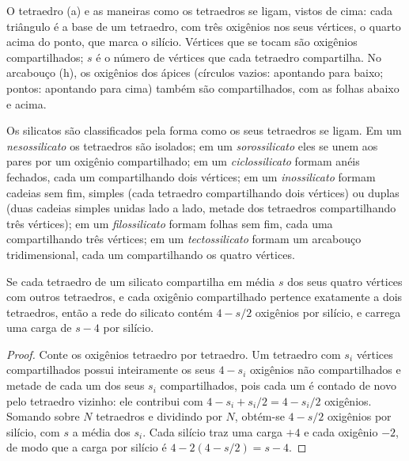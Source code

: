 \begin{omfigure}
{\small O tetraedro  (a) e as maneiras como os tetraedros se ligam, vistos de cima: cada triângulo é a base de um tetraedro, com três oxigênios nos seus vértices, o quarto acima do ponto, que marca o silício. Vértices que se tocam são oxigênios compartilhados; $s$ é o número de vértices que cada tetraedro compartilha. No arcabouço (h), os oxigênios dos ápices (círculos vazios: apontando para baixo; pontos: apontando para cima) também são compartilhados, com as folhas abaixo e acima.}
\end{omfigure}

\begin{definition}\label{def:b1:rock-forming-minerals:silicate-classes}
Os silicatos são classificados pela forma como os seus tetraedros  se ligam. Em um \emph{nesossilicato} os tetraedros são isolados; em um \emph{sorossilicato} eles se unem aos pares por um oxigênio compartilhado; em um \emph{ciclossilicato} formam anéis fechados, cada um compartilhando dois vértices; em um \emph{inossilicato} formam cadeias sem fim, simples (cada tetraedro compartilhando dois vértices) ou duplas (duas cadeias simples unidas lado a lado, metade dos tetraedros compartilhando três vértices); em um \emph{filossilicato} formam folhas sem fim, cada uma compartilhando três vértices; em um \emph{tectossilicato} formam um arcabouço tridimensional, cada um compartilhando os quatro vértices.
\end{definition}

\begin{proposition}\label{prop:b1:rock-forming-minerals:si-o}
Se cada tetraedro  de um silicato compartilha em média $s$ dos seus quatro vértices com outros tetraedros, e cada oxigênio compartilhado pertence exatamente a dois tetraedros, então a rede do silicato contém $4 - s/2$ oxigênios por silício, e carrega uma carga de $s - 4$ por silício.
\end{proposition}

\begin{proof}
Conte os oxigênios tetraedro por tetraedro. Um tetraedro com $s_i$ vértices compartilhados possui inteiramente os seus $4 - s_i$ oxigênios não compartilhados e metade de cada um dos seus $s_i$ compartilhados, pois cada um é contado de novo pelo tetraedro vizinho: ele contribui com $4 - s_i + s_i/2 = 4 - s_i/2$ oxigênios. Somando sobre $N$ tetraedros e dividindo por $N$, obtém-se $4 - s/2$ oxigênios por silício, com $s$ a média dos $s_i$. Cada silício traz uma carga $+4$ e cada oxigênio $-2$, de modo que a carga por silício é $4 - 2(4 - s/2) = s - 4$.
\end{proof}

